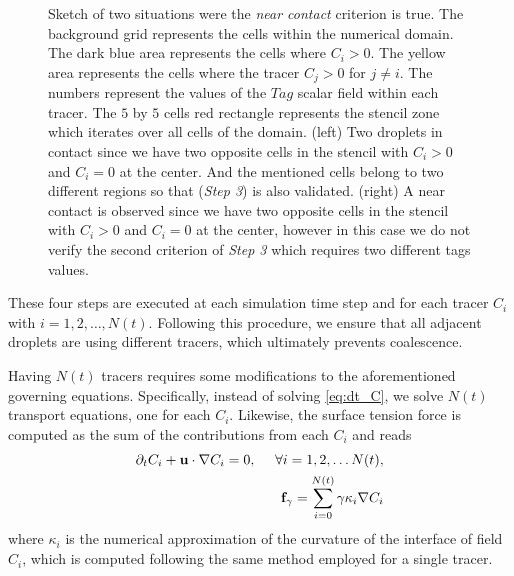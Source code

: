 \begin{figure}
    \caption{Sketch of two situations were the \textit{near contact} criterion is true. 
    The background grid represents the cells within the numerical domain. 
    The dark blue area represents the cells where $C_i > 0$.
    The yellow area represents the cells where the tracer $C_j > 0$ for $j\neq i$. 
    The numbers represent the values of the $Tag$ scalar field within each tracer.
    The $5$ by $5$ cells red rectangle represents the stencil zone which iterates over all cells of the domain.  
    (left) Two droplets in contact since we have two opposite cells in the stencil with $C_i > 0$ and $C_i=0$ at the center.
    And the mentioned cells belong to two different regions so that (\textit{Step 3}) is also validated.  
    (right) A near contact is observed since we have two opposite cells in the stencil with $C_i > 0$ and $C_i=0$ at the center, however in this case we do not verify the second criterion of \textit{Step 3} which requires two different tags values. 
    }
    \label{fig:criterion}
\end{figure}
These four steps are executed at each simulation time step and for each tracer $C_i$ with $i = 1, 2, \ldots, N(t)$.
Following this procedure, we ensure that all adjacent droplets are using different tracers, which ultimately prevents coalescence. 

Having $N(t)$ tracers requires some modifications to the aforementioned governing equations. 
Specifically, instead of solving \ref{eq:dt_C}, we solve $N(t)$ transport equations, one for each $C_i$.
Likewise, the surface tension force is computed as the sum of the contributions from each $C_i$ and reads
\begin{align*}
    \partial_t C_i + \textbf{u}\cdot\mathbf{\nabla} C_i = 0,
    \ \  \ \ \forall i = 1,2,\ldots N(t),\\
    \textbf{f}_\gamma 
    = \sum_{i=0}^{N(t)} \gamma \kappa_i \mathbf{\nabla} C_i
\end{align*}
where $\kappa_i$ is the numerical approximation of the curvature of the interface of field $C_i$, which is computed following the same method employed for a single tracer. 

